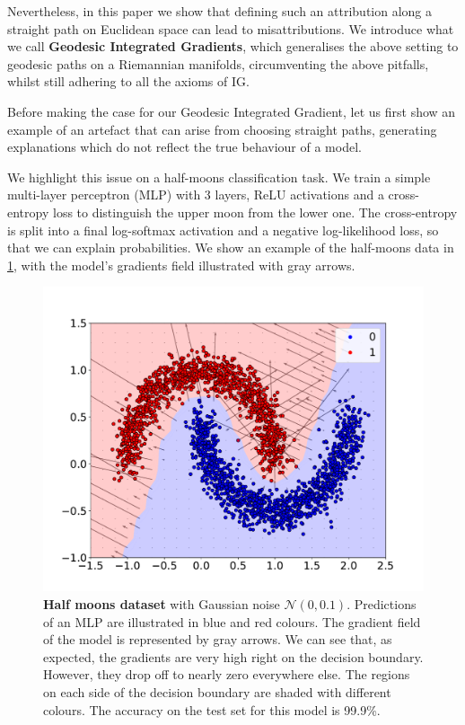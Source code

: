 Nevertheless, in this paper we show that defining such an attribution along a straight path on Euclidean space can lead to misattributions. We introduce what we call \textbf{Geodesic Integrated Gradients}, which generalises the above setting to geodesic paths on a Riemannian manifolds, circumventing the above pitfalls, whilst still adhering to all the axioms of IG.

Before making the case for our Geodesic Integrated Gradient, let us first show an example of an artefact that can arise from choosing straight paths, generating explanations which do not reflect the true behaviour of a model. 

We highlight this issue on a half-moons classification task. We train a simple multi-layer perceptron (MLP) with 3 layers, ReLU activations and a cross-entropy loss to distinguish the upper moon from the lower one. The cross-entropy is split into a final log-softmax activation and a negative log-likelihood loss, so that we can explain probabilities. We show an example of the half-moons data in  \ref{fig:half_moons}, with the model's gradients field illustrated with gray arrows.

\begin{figure}[ht]
\begin{center}
\centerline{\includegraphics[width=0.9\columnwidth]{figures/half_moons.pdf}}
\caption{\textbf{Half moons dataset} with Gaussian noise $\mathcal{N}(0, 0.1)$. Predictions of an MLP are illustrated in blue and red colours. The gradient field of the model is represented by gray arrows. We can see that, as expected, the gradients are very high right on the decision boundary. However, they drop off to nearly zero everywhere else. The regions on each side of the decision boundary are shaded with different colours. The accuracy on the test set for this model is 99.9\%.}
\label{fig:half_moons}
\end{center}
\vskip -0.3in
\end{figure}

